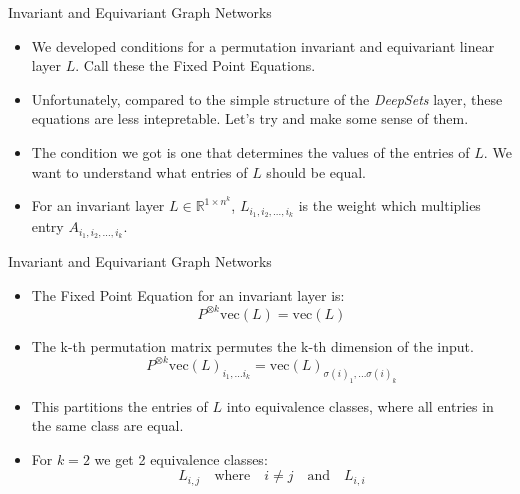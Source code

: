 \documentclass{beamer}
\begin{document}
\begin{frame}{Invariant and Equivariant Graph Networks}
    \begin{itemize}
        \setlength{\itemsep}{\fill}
        \item We developed conditions for a permutation invariant and equivariant linear layer $L$. Call these the Fixed Point Equations.
        \item Unfortunately, compared to the simple structure of the \emph{DeepSets} layer, these equations are less intepretable. Let's try and make some sense of them.
        \item The condition we got is one that determines the values of the entries of $L$. We want to understand what entries of $L$ should be equal.
        \item For an invariant layer $L \in \mathbb{R}^{1 \times n^k}$, $L_{i_1,i_2,\ldots,i_k}$ is the weight which multiplies entry $A_{i_1,i_2,\ldots,i_k}$.
    \end{itemize}
\end{frame}
\begin{frame}{Invariant and Equivariant Graph Networks}
    \begin{itemize}
        \setlength{\itemsep}{\fill}
        \item The Fixed Point Equation for an invariant layer is:
        \[ P^{\otimes k}\text{vec}(L) = \text{vec}(L) \]
        \item The k-th permutation matrix permutes the k-th dimension of the input. 
        \[ P^{\otimes k}\text{vec}(L)_{i_1, \ldots i_k} = \text{vec}(L)_{\sigma(i)_1, \ldots \sigma(i)_k} \]
        \item This partitions the entries of $L$ into equivalence classes, where all entries in the same class are equal.
        \item For $k=2$ we get 2 equivalence classes:
        \[ L_{i,j} \quad \text{where} \quad i \neq j \quad \text{and} \quad L_{i,i} \]
    \end{itemize}
\end{frame}
\end{document}
